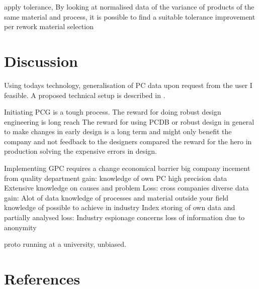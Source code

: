 \documentclass[aip,amsmath, reprint, author-year]{revtex4-1}
\begin{document}
apply tolerance, By looking at normalised data of the variance of products of the same material and process, it is possible to find a suitable tolerance
improvement per rework
material selection


\section{Discussion}

Using todays technology, generalisation of PC data upon request from the user I feasible. A proposed technical setup is described in \cite{OkholmRask}.

Initiating PCG is a tough process. 
The reward for doing robust design engineering is long reach
The reward for using PCDB or robust design in general to make changes in early design is a long term and might only benefit the company and not feedback to the designers compared the reward for the hero in production solving the expensive errors in design.

Implementing GPC requires a change
	economical barrier
		big company
			incement from quality department
			gain: 	knowledge of own PC
					high precision data
					Extensive knowledge on causes and problem
			Loss:
		cross companies
			diverse data
			gain:		Alot of data
					knowledge of processes and material outside your field
					knowledge of possible to achieve in industry
					Index storing of own data and partially analysed
			loss:		Industry espionage concerns
					loss of information due to anonymity

proto running at a university, unbiased.


\section*{References}

\end{document}
